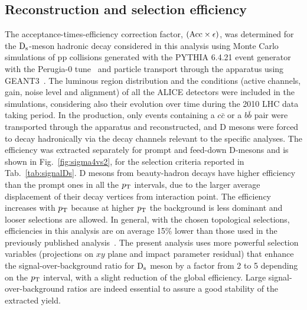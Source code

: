\subsection{Reconstruction and selection efficiency}
\label{sec:Effpp}
The acceptance-times-efficiency correction factor, 
$(\rm Acc \times \epsilon)$, was determined for the ${\rm D_s}$-meson
hadronic decay considered in this analysis using Monte Carlo simulations 
of pp collisions generated with the PYTHIA 6.4.21 event generator~\cite{Sjostrand:2006za} with the 
Perugia-0 tune~\cite{Skands:2010ak} and particle transport through the apparatus 
using GEANT3~\cite{Brun:1994aa}.
The luminous region distribution and the conditions (active channels, gain, 
noise level and alignment) of all the ALICE detectors were included in the 
simulations, considering also their evolution over time during the 2010 LHC 
data taking period.
In the production, only events containing a $c\bar{c}$ or a $b\bar{b}$ pair 
were transported through the apparatus and reconstructed, and
D mesons were forced to decay hadronically via the decay channels relevant to
the specific analyses.
The efficiency was extracted separately for prompt and feed-down D-mesons and 
is shown in Fig.~\ref{fig:sigma4vs2}, for the selection criteria
reported in Tab.~\ref{tab:signalDs}.
D mesons from beauty-hadron decays have higher efficiency than
the prompt ones in all the $p_{\rm T}$ intervals, due to the larger average displacement of their 
decay vertices from interaction point.
The efficiency increases with $p_{\rm T}$ because at higher $p_{\rm T}$ 
the background is less dominant and looser selections are allowed. 
In general, with the chosen topological selections, efficiencies in this analysis
are on average 15\% lower than those used in the previously published analysis~\cite{Abelev:2012tca}. 
The present analysis uses more powerful selection variables 
(projections on $xy$ plane and impact parameter residual) that
enhance the signal-over-background ratio for ${\rm D_s}$ meson by a factor 
from 2 to 5 depending on the $p_{\rm T}$ interval, with a slight reduction
of the global efficiency. Large signal-over-background ratios are indeed essential 
to assure a good stability of the extracted yield.

